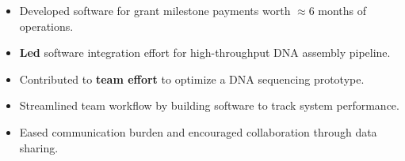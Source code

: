 \documentclass[margin]{res}
\begin{document}
\begin{sloppypar}
\begin{resume}
\begin{itemize}
    \item Developed software for grant milestone payments worth $\approx6$ months of operations.
    \item \textbf{Led} software integration effort for high-throughput DNA assembly pipeline.
\end{itemize}

\begin{itemize}
    \item Contributed to \textbf{team effort} to optimize a DNA sequencing prototype.
    \item Streamlined team workflow by building software to track system performance. 
    \item Eased communication burden and encouraged collaboration through data sharing.
\end{itemize}


\end{resume}
\end{sloppypar}
\end{document}
